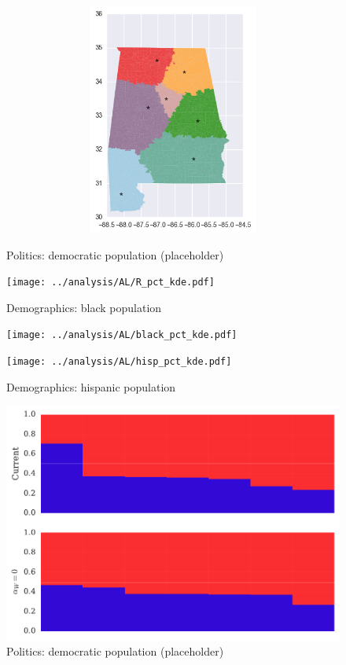 \begin{figure}[htb!]
\includegraphics[width=5in,height=3in,keepaspectratio]{../maps/AL/static/0_25_after.png}
\end{figure}

\clearpage
\newpage

\begin{figure}[htb!] \centering
\caption{ Politics: democratic population (placeholder)}
\texttt{[image: ../analysis/AL/R\_pct\_kde.pdf]}
\caption{ Demographics: black population }
\texttt{[image: ../analysis/AL/black\_pct\_kde.pdf]}
\caption{ Demographics: hispanic population }
\texttt{[image: ../analysis/AL/hisp\_pct\_kde.pdf]}
\end{figure}

\clearpage
\newpage

\begin{figure}[htb!] \centering
\caption{ Politics: democratic population (placeholder)}
\includegraphics[width=6in]{../analysis/AL/barplot.pdf}
\end{figure}

